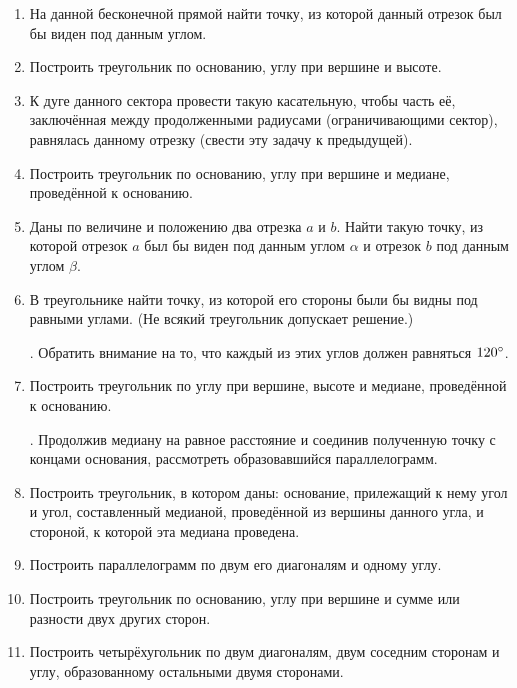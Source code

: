 \begin{enumerate}[resume]

\item
На данной бесконечной прямой найти точку, из которой данный отрезок был бы виден под данным углом.

\item
Построить треугольник по основанию, углу при вершине и высоте.

\item
К дуге данного сектора провести такую касательную, чтобы часть её, заключённая между продолженными радиусами (ограничивающими сектор), равнялась данному отрезку (свести эту задачу к предыдущей).

\item
Построить треугольник по основанию, углу при вершине и медиане, проведённой к основанию.

\item
Даны по величине и положению два отрезка $a$ и $b$.
Найти такую точку, из которой отрезок $a$ был бы виден под данным углом $\alpha$ и отрезок $b$ под данным углом $\beta$.

\item
В треугольнике найти точку, из которой его стороны были бы видны под равными углами.
(Не всякий треугольник допускает решение.)

\smallskip
{}.
Обратить внимание на то, что каждый из этих углов должен равняться $120\degree$.

\item
Построить треугольник по углу при вершине, высоте и медиане, проведённой к основанию.

\smallskip
{}.
Продолжив медиану на равное расстояние и соединив полученную точку с концами основания, рассмотреть образовавшийся параллелограмм.

\item
Построить треугольник, в котором даны:
основание, прилежащий к нему угол и угол, составленный медианой, проведённой из вершины данного угла, и стороной, к которой эта медиана проведена.

\item
Построить параллелограмм по двум его диагоналям и одному углу.

\item
Построить треугольник по основанию, углу при вершине и сумме или разности двух других сторон.

\item
Построить четырёхугольник по двум диагоналям, двум соседним сторонам и углу, образованному остальными двумя сторонами.


\end{enumerate}
